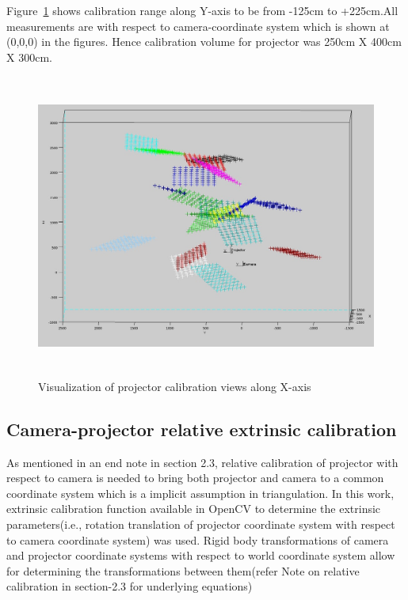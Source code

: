\noindent  
Figure~\ref{fig:proj_calib_plot_2} shows calibration range along Y-axis to be from -125cm to +225cm.All measurements are with respect to camera-coordinate system which is shown at (0,0,0) in the figures. Hence calibration volume for projector was 250cm X 400cm X 300cm.  
\begin{figure}[htbp]  
\includegraphics[width=15cm,height=10cm]{../img_source/proj_calib_plot_2.jpg}  
\caption{Visualization of projector calibration views along X-axis}  
\label{fig:proj_calib_plot_2}
\end{figure}  
  
  
  
  
  
\subsection{Camera-projector relative extrinsic calibration}   
As mentioned in an end note in section 2.3, relative calibration of projector with respect to camera is needed to bring both projector and camera to a common coordinate system which is a implicit assumption in triangulation. In this work, extrinsic calibration function available in OpenCV to determine the extrinsic parameters(i.e., rotation translation of projector coordinate system with respect to camera coordinate system) was used.  Rigid body transformations of camera and projector coordinate systems with respect to world coordinate system allow for determining the transformations between them(refer Note on relative calibration in section-2.3 for underlying equations)  
  
  
